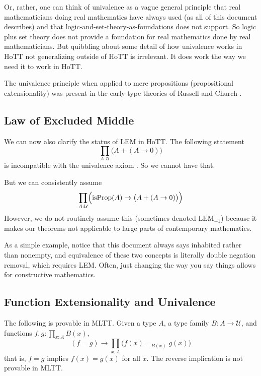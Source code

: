 \documentclass[11pt]{article}
\DeclareMathOperator{\isProp}{isProp}
\newcommand{\universe}{\mathcal{U}}
\begin{document}
Or, rather, one can think of univalence as a vague general principle that
real mathematicians doing real mathematics have always used (as all of this
document describes) and that
logic-and-set-theory-as-foundations does not support.  So logic plus set theory
does not provide a foundation for real mathematics done by real mathematicians.
But quibbling about some detail of how univalence works in HoTT not
generalizing outside of HoTT is irrelevant.
It does work the way we need it to work in HoTT.

The univalence principle when applied to mere propositions
(propositional extensionality) was present in the early type theories
of Russell and Church .

\subsection{Law of Excluded Middle}

We can now also clarify the status of LEM in
HoTT.  The following statement
$$
   \prod_{A : \universe} \bigl(A + (A \to 0)\bigr)
$$
is incompatible with the univalence axiom
.  So we cannot have that.

But we can consistently assume 
\begin{equation} \label{eq:propositional-lem}
   \prod_{A : \universe} \Bigl(\isProp(A) \to \bigl(A + (A \to 0)\bigr)
   \Bigr)
\end{equation}
However, we do not routinely assume this (sometimes denoted $\text{LEM}_{-1}$)
because it makes our theorems not applicable to large parts of contemporary
mathematics.

As a simple example, notice that this document always says inhabited rather
than nonempty, and
equivalence of these two concepts is literally double negation removal,
which requires LEM.  Often, just changing the way you say things
allows for constructive mathematics.

\subsection{Function Extensionality and Univalence}

The following is provable in MLTT. Given a type $A$,
a type family $B : A \to \universe$,
and functions $f, g : \prod_{x : A} B(x)$,
\begin{equation} \label{eq:happly}
   (f = g) \to \prod_{x : A} \bigl( f(x) =_{B(x)} g(x) \bigr)
\end{equation}
that is, $f = g$ implies $f(x) = g(x)$ for all $x$.
The reverse implication is not provable in MLTT.
\end{document}
